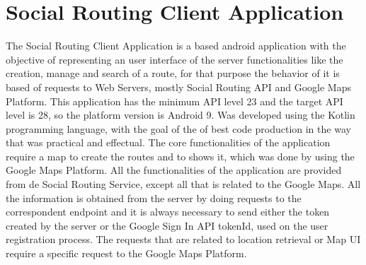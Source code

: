 \chapter{Social Routing Client Application}
The Social Routing Client Application is a based android application with the objective of representing an user interface of the server functionalities like the
creation, manage and search of a route, for that purpose the behavior of it is based of requests to Web Servers, mostly Social Routing API and Google Maps Platform.
This application has the minimum API level 23 and the target API level is 28, so the platform version is Android 9. Was developed using the Kotlin programming
language, with the goal of the of best code production in the way that was practical and effectual.
The core functionalities of the application require a map to create the routes and to shows it, which was done by using the Google Maps Platform.
All the functionalities of the application are provided from de Social Routing Service, except all that is related to the Google Maps.
All the information is obtained from the server by doing requests to the correspondent endpoint and it is always necessary to send either the token created by
the server or the Google Sign In API tokenId, used on the user registration process. The requests that are related to location retrieval or Map UI require a
specific request to the Google Maps Platform.\\


